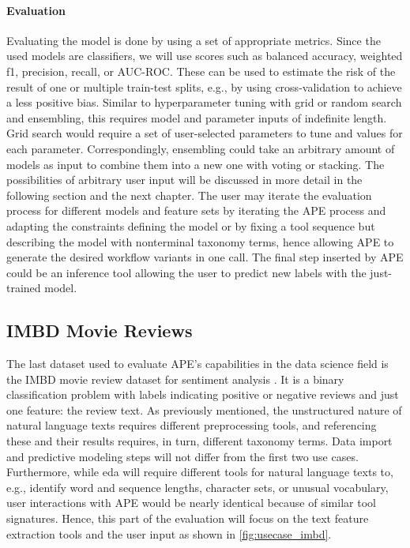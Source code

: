 \paragraph{Evaluation}
Evaluating the model is done by using a set of appropriate metrics. Since the used models are classifiers, we will use scores such as balanced accuracy, weighted f1, precision, recall, or AUC-ROC. These can be used to estimate the risk of the result of one or multiple train-test splits, e.g., by using cross-validation to achieve a less positive bias. Similar to hyperparameter tuning with grid or random search and ensembling, this requires model and parameter inputs of indefinite length. Grid search would require a set of user-selected parameters to tune and values for each parameter. Correspondingly, ensembling could take an arbitrary amount of models as input to combine them into a new one with voting or stacking. The possibilities of arbitrary user input will be discussed in more detail in the following section and the next chapter. The user may iterate the evaluation process for different models and feature sets by iterating the APE process and adapting the constraints defining the model or by fixing a tool sequence but describing the model with nonterminal taxonomy terms, hence allowing APE to generate the desired workflow variants in one call. The final step inserted by APE could be an inference tool allowing the user to predict new labels with the just-trained model.

\subsection{IMBD Movie Reviews}
The last dataset used to evaluate APE’s capabilities in the data science field is the IMBD movie review dataset for sentiment analysis \cite{imbd,basicnlp}. It is a binary classification problem with labels indicating positive or negative reviews and just one feature: the review text. As previously mentioned, the unstructured nature of natural language texts requires different preprocessing tools, and referencing these and their results requires, in turn, different taxonomy terms. Data import and predictive modeling steps will not differ from the first two use cases. Furthermore, while \ac{eda} will require different tools for natural language texts to, e.g., identify word and sequence lengths, character sets, or unusual vocabulary, user interactions with APE would be nearly identical because of similar tool signatures. Hence, this part of the evaluation will focus on the text feature extraction tools and the user input as shown in \autoref{fig:usecase_imbd}.

